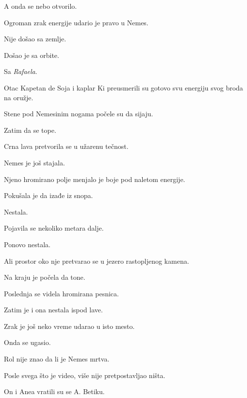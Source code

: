 A onda se nebo otvorilo.

\bigskip

Ogroman zrak energije udario je pravo u Nemes.

\bigskip

Nije došao sa zemlje.

\bigskip

Došao je sa orbite.

\bigskip

Sa \emph{Rafaela}.

\bigskip

Otac Kapetan de Soja i kaplar Ki preusmerili su gotovo svu energiju svog broda na oružje.

\bigskip

Stene pod Nemesinim nogama počele su da sijaju.

Zatim da se tope.

\bigskip

Crna lava pretvorila se u užarenu tečnost.

\bigskip

Nemes je još stajala.

\bigskip

Njeno hromirano polje menjalo je boje pod naletom energije.

Pokušala je da izađe iz snopa.

Nestala.

Pojavila se nekoliko metara dalje.

Ponovo nestala.

\bigskip

Ali prostor oko nje pretvarao se u jezero rastopljenog kamena.

\bigskip

Na kraju je počela da tone.

\bigskip

Poslednja se videla hromirana pesnica.

\bigskip

Zatim je i ona nestala ispod lave.

\bigskip

Zrak je još neko vreme udarao u isto mesto.

Onda se ugasio.

\bigskip

Rol nije znao da li je Nemes mrtva.

Posle svega što je video, više nije pretpostavljao ništa.

\bigskip

On i Anea vratili su se A. Betiku.


